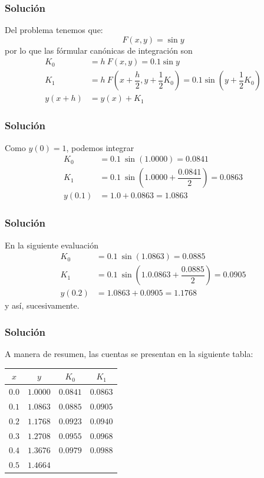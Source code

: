 \begin{frame}
\frametitle{Solución}
Del problema tenemos que:
\[ F(x, y) = \sin y\]
por lo que las fórmular canónicas de integración son
\begin{align*}
K_{0} &= h \:  F(x, y) = 0.1 \sin y \\
K_{1} &= h \: F \left( x + \dfrac{h}{2}, y + \dfrac{1}{2} K_{0} \right) = 0.1 \sin \left( y + \dfrac{1}{2} K_{0}\right) \\
y(x + h) &= y(x) + K_{1}
\end{align*}
\end{frame}
\begin{frame}
\frametitle{Solución}
Como $y(0) = 1$, podemos integrar
\begin{align*}
K_{0} &= 0.1 \:  \sin (1.0000) = 0.0841 \\
K_{1} &= 0.1 \: \sin \left( 1.0000 + \dfrac{0.0841}{2} \right)  = 0.0863 \\
y(0.1) &= 1.0 + 0.0863 = 1.0863
\end{align*}
\end{frame}
\begin{frame}
\frametitle{Solución}
En la siguiente evaluación
\begin{align*}
K_{0} &= 0.1 \: \sin (1.0863) = 0.0885 \\
K_{1} &= 0.1 \: \sin \left( 1.0.0863 + \dfrac{0.0885}{2} \right)  = 0.0905 \\
y(0.2) &= 1.0863 + 0.0905 = 1.1768
\end{align*}
y así, sucesivamente.
\end{frame}
\begin{frame}[plain]
\frametitle{Solución}
A manera de resumen, las cuentas se presentan en la siguiente tabla:
\begin{center}
\begin{tabular}{c | c | c | c |}
$x$ & $y$ & $K_{0}$ & $K_{1}$ \\ 
\hline
\hline
$0.0$ & $1.0000$ & $0.0841$ & $0.0863$ \\ \hline
$0.1$ & $1.0863$ & $0.0885$ & $0.0905$ \\ \hline
$0.2$ & $1.1768$ & $0.0923$ & $0.0940$ \\ \hline
$0.3$ & $1.2708$ & $0.0955$ & $0.0968$ \\ \hline
$0.4$ & $1.3676$ & $0.0979$ & $0.0988$ \\ \hline
$0.5$ & $1.4664$ & & \\ \hline
\end{tabular}
\end{center}
\end{frame}
